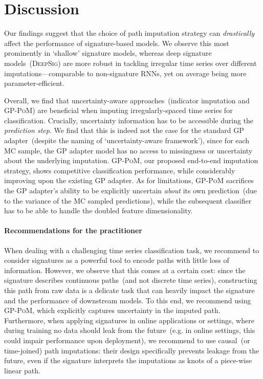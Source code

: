 \documentclass{article}
\begin{document}
\section{Discussion}

Our findings suggest that the choice of path imputation strategy can
\emph{drastically} affect the performance of signature-based models. We
observe this most prominently in `shallow' signature models, whereas deep signature models~(\textsc{DeepSig})
are more robust in tackling irregular time series over different
imputations---comparable to non-signature RNNs, yet on average being
more parameter-efficient.

Overall, we find that uncertainty-aware approaches~(indicator
imputation and \textsc{GP-PoM}) are beneficial when imputing
irregularly-spaced time series for classification.
%
Crucially, uncertainty information has to be accessible during the
\emph{prediction step}. We find that this is indeed not the case for
the standard GP adapter~(despite the naming of `uncertainty-aware
framework'), since for each MC sample, the GP adapter model has no access
to missingness or uncertainty about the underlying imputation.
\textsc{GP-PoM}, our proposed end-to-end imputation strategy, shows
competitive classification performance, while considerably improving
upon the existing GP adapter. As for
limitations, \textsc{GP-PoM} sacrifices the GP adapter's ability to be
explicitly uncertain \emph{about} its own prediction~(due to the
variance of the MC sampled predictions), while the subsequent classifier
has to be able to handle the doubled feature dimensionality.

\paragraph{Recommendations for the practitioner}
%
When dealing with a challenging time series classification task, we recommend to consider signatures as a powerful tool to encode paths with little loss of information. However, we observe that this comes at a certain cost: since the signature describes continuous paths~(and not discrete time series), constructing this path from raw data is a delicate task that can heavily impact the signature and the performance of downstream models. To this end, we recommend using \textsc{GP-PoM}, which explicitly captures uncertainty in the imputed path. 
Furthermore, when applying signatures in online applications or settings, where during training no data should leak from the future~(e.g. in online settings, this could impair performance upon deployment), we recommend to use causal~(or time-joined) path imputations: their design specifically prevents leakage from the future, even if the signature interprets the imputations as knots of a piece-wise linear path. 
\end{document}
